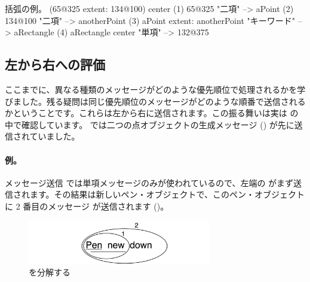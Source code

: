 \documentclass[a4paper,10pt,twoside]{book}
\begin{document}
\begin{example}[decExtent]{括弧の例。}{}
      (65@325 extent: 134@100) center
(1)   65@325                                                    "二項"
    --> aPoint
(2)                                134@100                     "二項"
                                 --> anotherPoint
(3)   aPoint extent: anotherPoint                       "キーワード"
      --> aRectangle
(4)   aRectangle center                                     "単項"
      --> 132@375
\end{example}

\subsection{左から右への評価}
ここまでに、異なる種類のメッセージがどのような優先順位で処理されるかを学びました。残る疑問は同じ優先順位のメッセージがどのような順番で送信されるかということです。これらは左から右に送信されます。この振る舞いは実は  の中で確認しています。 では二つの点オブジェクトの生成メッセージ () が先に送信されていました。



\paragraph{例。} メッセージ送信  では単項メッセージのみが使われているので、左端の  がまず送信されます。その結果は新しいペン・オブジェクトで、このペン・オブジェクトに 2 番目のメッセージ  が送信されます ()。

\begin{figure}
	\centering
	\includegraphics[width=8cm]{ucompoUn}
	\caption{ を分解する}
\end{figure}
\end{document}
